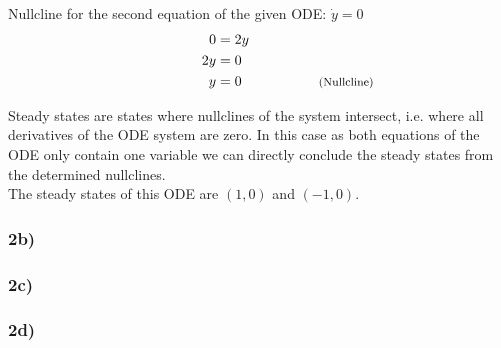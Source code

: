 \documentclass[]{scrartcl}
\begin{document}
\begin{center}
Nullcline for the second equation of the given ODE: $\dot{y} = 0$
\begin{align*}
	0  & = 2y &					&  \\
	2y & = 0  &					&  \\
	 y & = 0  & \hspace{4em}	& \rlap{\footnotesize (Nullcline)} \\
\end{align*}
\end{center}

Steady states are states where nullclines of the system intersect, i.e. where all derivatives of the ODE system are zero.
In this case as both equations of the ODE only contain one variable we can directly conclude the steady states from the determined nullclines.
\\
The steady states of this ODE are $(1,0)$ and $(-1,0)$.




\subsubsection*{2b)}





\subsubsection*{2c)}





\subsubsection*{2d)}
\end{document}
